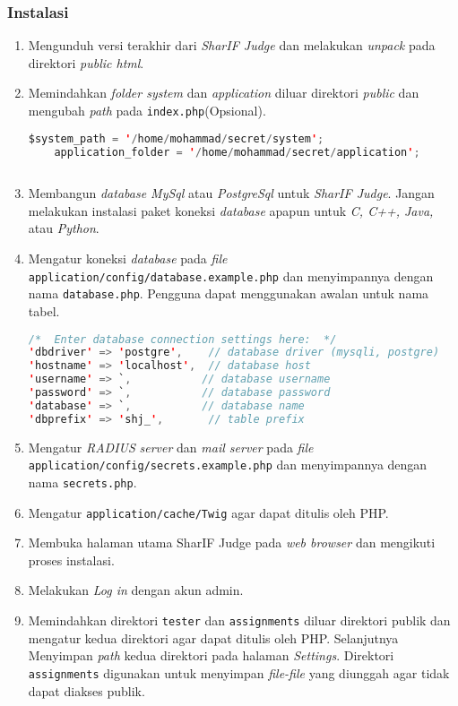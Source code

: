 \subsubsection{Instalasi}
\begin{enumerate}
\item Mengunduh versi terakhir dari \textit{SharIF Judge} dan melakukan \textit{unpack} pada direktori \textit{public html}.
\item Memindahkan \textit{folder system} dan \textit{application} diluar direktori \textit{public} dan mengubah \textit{path} pada \verb|index.php|(Opsional).

\begin{lstlisting}[language=Java, caption=Contoh \textit{path} pada halaman index.php, label=kode:movesystemandapp]
	$system_path = '/home/mohammad/secret/system';
	application_folder = '/home/mohammad/secret/application';
	
\end{lstlisting}
\item Membangun \textit{database MySql} atau \textit{PostgreSql} untuk \textit{SharIF Judge}. Jangan melakukan instalasi paket koneksi \textit{database} apapun untuk \textit{C, C++, Java,} atau \textit{Python}.
\item Mengatur koneksi \textit{database} pada \textit{file} \verb|application/config/database.example.php| dan menyimpannya dengan nama \verb|database.php|. Pengguna dapat menggunakan awalan untuk nama tabel.

\begin{lstlisting}[language=Java, caption=Contoh pengaturan koneksi untuk \textit{database}, label=kode:dbsetup]
/*  Enter database connection settings here:  */
'dbdriver' => 'postgre',    // database driver (mysqli, postgre)
'hostname' => 'localhost',  // database host
'username' => `,           // database username
'password' => `,           // database password
'database' => `,           // database name
'dbprefix' => 'shj_',       // table prefix
\end{lstlisting}
\item Mengatur \textit{RADIUS} \textit{server} dan \textit{mail server} pada \textit{file} \verb|application/config/secrets.example.php| dan menyimpannya dengan nama \verb|secrets.php|.
\item Mengatur \verb|application/cache/Twig| agar dapat ditulis oleh PHP.
\item Membuka halaman utama SharIF Judge pada \textit{web browser} dan mengikuti proses instalasi.
\item Melakukan \textit{Log in} dengan akun admin.
\item Memindahkan direktori \verb|tester| dan \verb|assignments| diluar direktori publik dan mengatur kedua direktori agar dapat ditulis oleh PHP. Selanjutnya Menyimpan \textit{path} kedua direktori pada halaman \textit{Settings}. Direktori \verb|assignments| digunakan untuk menyimpan \textit{file-file} yang diunggah agar tidak dapat diakses publik.

\end{enumerate}

